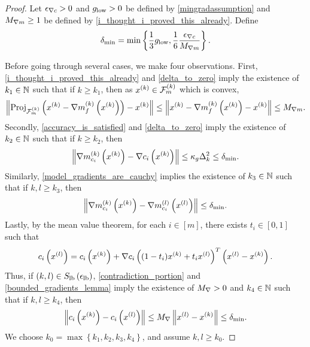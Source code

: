 \begin{proof}

Let ${\epsilon_{\nabla c}} > 0$ and ${ g_{\textrm{low}} } > 0$ be defined by \cref{mingradassumption}
and ${M_{\nabla m}} \ge 1$ be defined by \cref{i_thought_i_proved_this_already}.
Define
\begin{align*}
{\delta_{\textrm{min}}} = \min\left\{\frac 1 3 { g_{\textrm{low}} }, \frac 1 {6} \frac{{\epsilon_{\nabla c}}}{{M_{\nabla m}}} \right\}.
\end{align*}

Before going through several cases, we make four observations.
First, \cref{i_thought_i_proved_this_already} and \cref{delta_to_zero} imply the existence of $k_1 \in \mathbb N$
such that if $k \ge k_1$, then as $x^{(k)} \in {\mathcal F_m^{(k)}}$ which is convex,
\begin{align*}
\left\|{\textrm{Proj}}_{{\mathcal F_m^{(k)}}}\left(x^{(k)} - {\nabla m_f^{(k)}\left(x^{(k)}\right)}\right) - x^{(k)}\right\| 
\le \left\|x^{(k)} - {\nabla m_f^{(k)}\left(x^{(k)}\right)} - x^{(k)} \right\| \le {M_{\nabla m}}.
\end{align*}
Secondly, \cref{accuracy_is_satisfied} and \cref{delta_to_zero} imply the existence of $k_2 \in \mathbb N$ such that if $k \ge k_2$, then
\begin{align}
\left\|{\nabla m_{c_i}^{(k)}\left(x^{(k)}\right)} - \nabla c_i\left(x^{(k)}\right)\right\| \le \kappa_g \Delta_k^2 \le {\delta_{\textrm{min}}}. \label{hmoydihtp_eqn1}
\end{align}
Similarly, \cref{model_gradients_are_cauchy} implies the existence of $k_3 \in \mathbb N$ such that if $k, l \ge k_3$, then 
\begin{align}
\left\|{\nabla m_{c_i}^{(k)}\left(x^{(k)}\right)} - {\nabla m_{c_i}^{(l)}\left({x^{(l)}}\right)}\right\| \le {\delta_{\textrm{min}}}. \label{hmoydihtp_eqn2}
\end{align}
Lastly, by the mean value theorem, for each $i \in [m]$, there exists $t_i \in [0, 1]$ such that
\begin{align*}
c_i\left({x^{(l)}}\right) = c_i\left(x^{(k)}\right) + \nabla c_i\left((1 - t_i)x^{(k)} + t_i {x^{(l)}}\right)^T\left({x^{(l)}} - x^{(k)}\right).
\end{align*}
Thus, if $(k, l) \in {S_{\textrm{lb}}\left(\epsilon_{\textrm{lb}}\right)}$, \cref{contradiction_portion} and \cref{bounded_gradients_lemma}
imply the existence of ${M_{\nabla}} > 0$ and $k_4 \in \mathbb N$ such that if $k, l \ge k_4$, 
then
\begin{align}
\left\|c_i\left(x^{(k)}\right) - c_i\left({x^{(l)}}\right) \right\| \le {M_{\nabla}} \left\|{x^{(l)}} - x^{(k)}\right\| \le {\delta_{\textrm{min}}}. \label{hmoydihtp_eqn3}
\end{align}
We choose $k_0 = \max\left\{k_1, k_2, k_3, k_4\right\}$, and assume $k, l \ge k_0$.


\end{proof}

